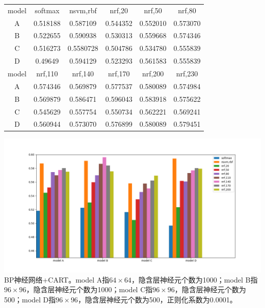 \begin{center}
\begin{tabular}{cccccc}
\toprule[2pt]
model & softmax & nsvm,rbf & nrf,20 & nrf,50 & nrf,80 \\ 
A & 0.518188 & 0.587109 & 0.544352 & 0.552010 & 0.573070 \\ 
B & 0.522655 & 0.590938 & 0.530313 & 0.559668 & 0.574346 \\ 
C & 0.516273 & 0.5580728 & 0.504786 & 0.534780 & 0.555839 \\  
D & 0.49649 & 0.594129 & 0.523293 & 0.561583 & 0.555839 \\ 
\midrule[2pt]
model & nrf,110 & nrf,140 & nrf,170 & nrf,200 & nrf,230 \\ 
A & 0.574346 & 0.569879 & 0.577537 & 0.580089 & 0.574984 \\ 
B & 0.569879 & 0.586471 & 0.596043 & 0.583918 & 0.575622 \\ 
C & 0.545629 & 0.557754 & 0.550734 & 0.562221 & 0.569241 \\ 
D & 0.560944 & 0.573070 & 0.576899 & 0.580089 & 0.579451 \\ 
\bottomrule[2pt]
\end{tabular} 
\end{center}
\begin{center}
\includegraphics[scale=0.5]{../figures/NN_rf1.png} \\
BP神经网络+CART。model A指$64\times64$，隐含层神经元个数为1000；model B指$96\times96$，隐含层神经元个数为1000；model C指$96\times96$，隐含层神经元个数为500；model D指$96\times96$，隐含层神经元个数为500，正则化系数为0.0001。
\end{center}






